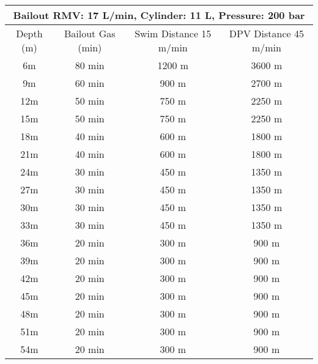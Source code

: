 \documentclass{article}
\begin{document}
\begin{tabular}{|c|c|c|c|}
\hline
\multicolumn{4}{|c|}{Bailout RMV: 17 L/min, Cylinder: 11 L, Pressure: 200 bar} \\ 
\hline
Depth (m) & Bailout Gas (min) & Swim Distance 15 m/min & DPV Distance 45 m/min \\ 
\hline
6m & 80 min & 1200 m & 3600 m \\ 
\hline
9m & 60 min & 900 m & 2700 m \\ 
\hline
12m & 50 min & 750 m & 2250 m \\ 
\hline
15m & 50 min & 750 m & 2250 m \\ 
\hline
18m & 40 min & 600 m & 1800 m \\ 
\hline
21m & 40 min & 600 m & 1800 m \\ 
\hline
24m & 30 min & 450 m & 1350 m \\ 
\hline
27m & 30 min & 450 m & 1350 m \\ 
\hline
30m & 30 min & 450 m & 1350 m \\ 
\hline
33m & 30 min & 450 m & 1350 m \\ 
\hline
36m & 20 min & 300 m & 900 m \\ 
\hline
39m & 20 min & 300 m & 900 m \\ 
\hline
42m & 20 min & 300 m & 900 m \\ 
\hline
45m & 20 min & 300 m & 900 m \\ 
\hline
48m & 20 min & 300 m & 900 m \\ 
\hline
51m & 20 min & 300 m & 900 m \\ 
\hline
54m & 20 min & 300 m & 900 m \\ 
\hline
\end{tabular}
\end{document}
